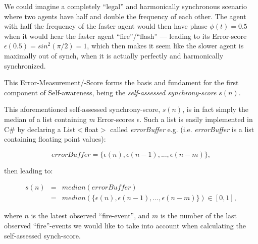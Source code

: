 			We could imagine a completely ``legal'' and harmonically synchronous scenario where two agents have half and double the frequency of each other. The agent with half the frequency of the faster agent would then have phase $\phi(t)=0.5$ when it would hear the faster agent ``fire''/``flash'' — leading to its Error-score $\epsilon(0.5) = sin^2(\pi/2) = 1$, which then makes it seem like the slower agent is maximally out of synch, when it is actually perfectly and harmonically synchronized.  
			
			This Error-Measurement/-Score forms the basis and fundament for the first component of Self-awareness, being the \textit{self-assessed synchrony-score} $s(n)$.
			
			This aforementioned self-assessed synchrony-score, $s(n)$, is in fact simply the median of a list  containing \textit{m} Error-scores $\epsilon$. Such a list is easily implemented in C\# by declaring a List$<$float$>$ called \textit{errorBuffer} e.g. (i.e. \textit{errorBuffer} is a list containing floating point values):
			
			\begin{equation}
			\label{error_buffer}
				errorBuffer = \{\epsilon(n), \epsilon(n-1), ... , \epsilon(n-m)\},
			\end{equation} \nl
			
			then leading to:
			
			\begin{equation}
			\label{self_assessed_synch}
				\begin{array}{rrclcl}
				s(n) & = & median(errorBuffer) \\ 
				& = & median(\{\epsilon(n), \epsilon(n-1), ... , \epsilon(n-m)\}) \in [0, 1],
				\end{array}
			\end{equation} \nl
			
			where $n$ is the latest observed ``fire-event'', and $m$ is the number of the last observed ``fire''-events we would like to take into account when calculating the self-assessed synch-score.
			

